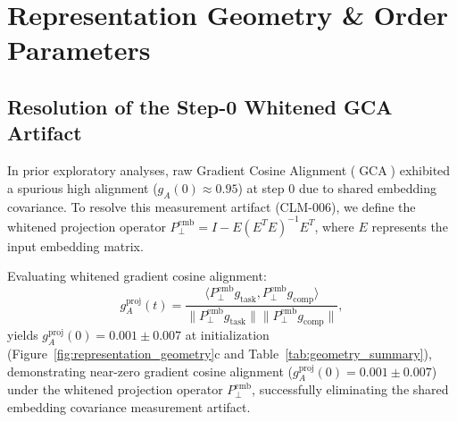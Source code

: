 \documentclass{article}
\theoremstyle{plain}
\theoremstyle{definition}
\DeclareMathOperator{\GCA}{GCA}
\begin{document}
\section{Representation Geometry \& Order Parameters}
\label{sec:representation_geometry}

\subsection{Resolution of the Step-0 Whitened GCA Artifact}
In prior exploratory analyses, raw Gradient Cosine Alignment ($\GCA$) exhibited a spurious high alignment ($g_A(0) \approx 0.95$) at step 0 due to shared embedding covariance. To resolve this measurement artifact (CLM-006), we define the whitened projection operator $P_{\perp}^{\text{emb}} = I - E (E^T E)^{-1} E^T$, where $E$ represents the input embedding matrix.

Evaluating whitened gradient cosine alignment:
\begin{equation}
    g_A^{\text{proj}}(t) = \frac{\langle P_{\perp}^{\text{emb}} g_{\text{task}}, P_{\perp}^{\text{emb}} g_{\text{comp}} \rangle}{\|P_{\perp}^{\text{emb}} g_{\text{task}}\| \|P_{\perp}^{\text{emb}} g_{\text{comp}}\|},
    \label{eq:whitened_gca}
\end{equation}
yields $g_A^{\text{proj}}(0) = 0.001 \pm 0.007$ at initialization (Figure~\ref{fig:representation_geometry}c and Table~\ref{tab:geometry_summary}), demonstrating near-zero gradient cosine alignment ($g_A^{\text{proj}}(0) = 0.001 \pm 0.007$) under the whitened projection operator $P_{\perp}^{\text{emb}}$, successfully eliminating the shared embedding covariance measurement artifact.

\begin{table}[t]
\centering
\caption{\textbf{Representation Geometry Diagnostics \& Temporal Lead-Lag Analysis.} Layerwise Centered Kernel Alignment (CKA) and whitened Gradient Cosine Alignment (GCA) demonstrate that internal representation alignment precedes behavioral OOD generalization.}
\label{tab:geometry_summary}
\vskip 0.1in
\begin{small}
\begin{sc}
\end{sc}
\end{small}
\end{table}
\end{document}
